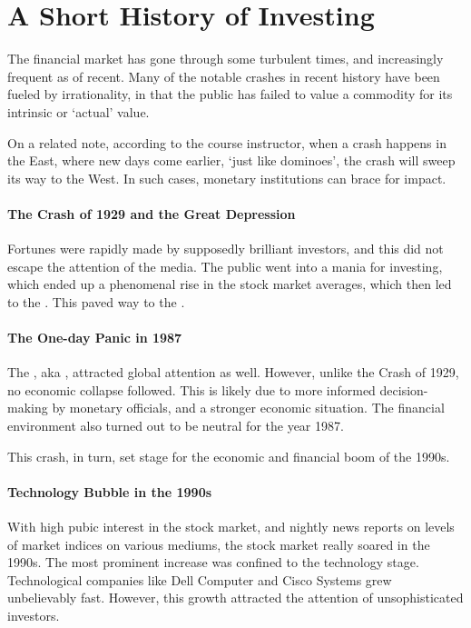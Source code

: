 \documentclass[notoc,notitlepage]{tufte-book}
\begin{document}
\section{A Short History of Investing}%
\label{sec:a_short_history_of_investing}

The financial market has gone through some turbulent times,
and increasingly frequent as of recent.
Many of the notable crashes in recent history have been fueled
by irrationality, in that the public has failed to value a commodity
for its intrinsic or `actual' value.

On a related note, according to the course instructor,
when a crash happens in the East,
where new days come earlier, `just like dominoes',
the crash will sweep its way to the West.
In such cases, monetary institutions can brace for impact.

\paragraph{The Crash of 1929 and the Great Depression}
Fortunes were rapidly made by supposedly brilliant investors,
and this did not escape the attention of the media.
The public went into a mania for investing,
which ended up a phenomenal rise in the stock market averages,
which then led to the .
This paved way to the .

\paragraph{The One-day Panic in 1987}
The , aka ,
\cite{wiki:blackmonday1987} attracted global attention as well.
However, unlike the Crash of 1929, no economic collapse followed.
This is likely due to more informed decision-making by monetary officials,
and a stronger economic situation.
The financial environment also turned out to be neutral for the year 1987.

This crash, in turn, set stage for the economic and financial boom of the 1990s.

\paragraph{Technology Bubble in the 1990s}
With high pubic interest in the stock market,
and nightly news reports on levels of market indices on various mediums,
the stock market really soared in the 1990s.
The most prominent increase was confined to the technology stage.
Technological companies like Dell Computer and Cisco Systems
grew unbelievably fast.  
However, this growth attracted the attention of unsophisticated investors.
\end{document}
